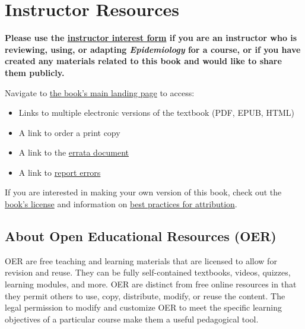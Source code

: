 \documentclass[
  letterpaper,
  DIV=11,
  numbers=noendperiod]{scrreprt}
\theoremstyle{definition}
\theoremstyle{remark}
\begin{document}
\section*{Instructor Resources}\label{instructor-resources}


\textbf{Please use the
\href{https://bit.ly/teachagriculture_interest}{instructor interest
form} if you are an instructor who is reviewing, using, or adapting
\emph{Epidemiology} for a course, or if you have created any materials
related to this book and would like to share them publicly.}

Navigate to \href{https://doi.org/10.21061/teachagriculture}{the book's
main landing page} to access:

\begin{itemize}
\item
  Links to multiple electronic versions of the textbook (PDF, EPUB,
  HTML)
\item
  A link to order a print copy
\item
  A link to the \href{https://bit.ly/teachagriculture_errata}{errata
  document}
\item
  A link to \href{https://bit.ly/teachagriculture_errors}{report errors}
\end{itemize}

If you are interested in making your own version of this book, check out
the \href{https://creativecommons.org/licenses/by-nc/4.0/deed.en}{book's
license} and information on
\href{https://wiki.creativecommons.org/wiki/Best_practices_for_attribution}{best
practices for attribution}.

\subsection*{\texorpdfstring{\textbf{About Open Educational Resources
(OER)}}{About Open Educational Resources (OER)}}\label{about-open-educational-resources-oer}

OER are free teaching and learning materials that are licensed to allow
for revision and reuse. They can be fully self-contained textbooks,
videos, quizzes, learning modules, and more. OER are distinct from free
online resources in that they permit others to use, copy, distribute,
modify, or reuse the content. The legal permission to modify and
customize OER to meet the specific learning objectives of a particular
course make them a useful pedagogical tool.
\end{document}
